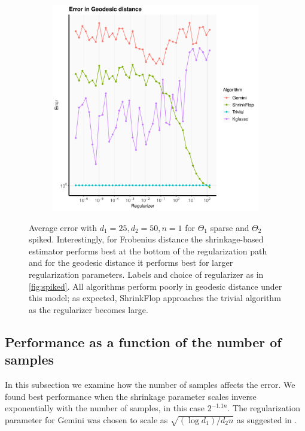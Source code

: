 \documentclass[aos]{imsart}
\theoremstyle{definition}
\numberwithin{equation}{section}
\begin{document}
\begin{figure}
\begin{subfigure}[b]{.4\textwidth}
         \includegraphics[width=\textwidth]{./code/zhou-comparison/25-50-sparse-geo.pdf}
         \end{subfigure}
\caption{Average error with $d_1 = 25, d_2 = 50, n = 1$ for $\Theta_1$ sparse and $\Theta_2$ spiked. Interestingly, for Frobenius distance the shrinkage-based estimator performs best at the bottom of the regularization path and for the geodesic distance it performs best for larger regularization parameters.
Labels and choice of regularizer as in \cref{fig:spiked}. All algorithms perform poorly in geodesic distance under this model; as expected, ShrinkFlop approaches the trivial algorithm as the regularizer becomes large.}\label{fig:sparse-i}
\end{figure}

\subsection{Performance as a function of the number of samples}
In this subsection we examine how the number of samples affects the error. We found best performance when the shrinkage parameter scales inverse exponentially with the number of samples, in this case $2^{-1.1 n}$. The regularization parameter for Gemini was chosen to scale as $\sqrt{(\log d_1) / d_2 n}$ as suggested in \cite{zhou2014gemini}.
\end{document}
